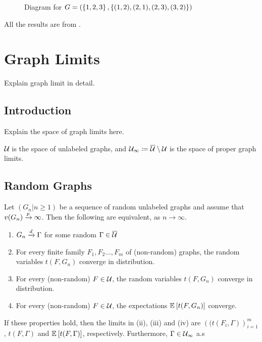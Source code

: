 \documentclass{article}
\begin{document}

\begin{figure}
  \centering
  \caption{Diagram for $G=(\left\{ 1, 2, 3 \right\}, \left\{ (1,2), (2,1), (2,3), (3,2) \right\})$}
  \label{fig:example-graph}
\end{figure}


All the results are from \cite{paper}.


\section{Graph Limits}
Explain graph limit in detail.
\subsection{Introduction}
Explain the space of graph limits here. 

$\Ug$ is the space of unlabeled graphs, and $\Ug[\infty] \coloneqq \Ug* \setminus \Ug$ is the space of proper graph limits.

\subsection{Random Graphs}
\begin{theorem}
  Let $(G_n | n \geq 1)$ be a sequence of random unlabeled graphs and assume that $v(G_n) \xrightarrow{p} \infty$. Then the following are equivalent, as $n \to \infty$.
  \begin{enumerate}
      \item $G_n \xrightarrow{d} \Gamma$ for some random $\Gamma \in \Ug*$
      \item For every finite family $F_1, F_2 \ldots, F_m$ of (non-random) graphs, the random variables $t(F, G_n)$ converge in distribution.
      \item For every (non-random) $F \in \Ug$, the random variables $t(F, G_n)$ converge in distribution.
      \item For every (non-random) $F \in \Ug$, the expectations $\Ex{t(F, G_n)}$ converge.
    \end{enumerate}
    If these properties hold, then the limits in (ii), (iii) and (iv) are $\left( (t(F_i, \Gamma) \right)_{i=1}^m$, $t(F, \Gamma)$ and $\Ex{t(F, \Gamma)}$, respectively. Furthermore, $\Gamma \in \Ug[\infty]$ a.s
  \label{thm:dconv-random-graphs}
\end{theorem}
\end{document}
